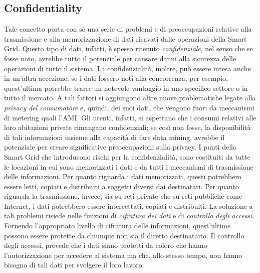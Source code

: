 \subsection{Confidentiality}
Tale concetto porta con sé una serie di problemi e di preoccupazioni relative alla trasmissione e alla memorizzazione di dati ricavati dalle operazioni della Smart Grid. Questo tipo di dati, infatti, è spesso ritenuto \textit{confidenziale}, nel senso che se fosse noto, avrebbe tutto il potenziale per causare danni alla sicurezza delle operazioni di tutto il sistema. \newline La confidenzialità, inoltre, può essere intesa anche in un'altra accezione: se i dati fossero noti alla concorrenza, per esempio,  quest'ultima potrebbe trarre un notevole vantaggio in uno specifico settore o in tutto il mercato. \newline A tali fattori si aggiungono altre nuove problematiche legate alla \textit{privacy del consumatore} e, quindi, dei suoi dati, che vengono fuori da meccanismi di metering quali l'AMI. Gli utenti, infatti, si aspettano che i consumi relativi alle loro abitazioni private rimangano confidenziali; se così non fosse, la disponibilità di tali informazioni insieme alla capacità di fare data mining, avrebbe il potenziale per creare significative preoccupazioni sulla privacy. \newline I punti della Smart Grid che introducono rischi per la confidenzialità, sono costituiti da tutte le locazioni in cui sono memorizzati i dati e da tutti i meccanismi di trasmissione delle informazioni. Per quanto riguarda i dati memorizzati, questi potrebbero essere letti, copiati e distribuiti a soggetti diversi dai destinatari. Per quanto riguarda la trasmissione, invece, sia su reti private che su reti pubbliche come Internet, i dati potrebbero essere intercettati, copiati e distribuiti. \newline La soluzione a tali problemi risiede nelle funzioni di \textit{cifratura dei dati} e di \textit{controllo degli accessi}. Fornendo l'appropriato livello di cifratura delle informazioni, quest'ultime possono essere protette da chiunque non sia il diretto destinatario. \newline Il controllo degli accessi, prevede che i dati siano protetti da coloro che hanno l'autorizzazione per accedere al sistema ma che, allo stesso tempo, non hanno bisogno di tali dati per svolgere il loro lavoro.

